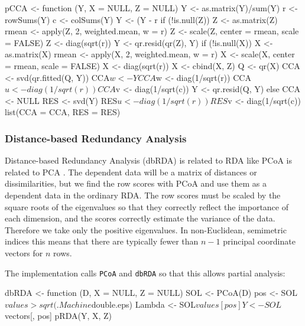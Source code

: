 \begin{Schunk}
\begin{Soutput}
pCCA <-
function (Y, X = NULL, Z = NULL) 
{
    Y <- as.matrix(Y)/sum(Y)
    r <- rowSums(Y)
    c <- colSums(Y)
    Y <- (Y - r %o% c)/sqrt(r %o% c)
    if (!is.null(Z)) {
        Z <- as.matrix(Z)
        rmean <- apply(Z, 2, weighted.mean, w = r)
        Z <- scale(Z, center = rmean, scale = FALSE)
        Z <- diag(sqrt(r)) %*% Z
        Y <- qr.resid(qr(Z), Y)
    }
    if (!is.null(X)) {
        X <- as.matrix(X)
        rmean <- apply(X, 2, weighted.mean, w = r)
        X <- scale(X, center = rmean, scale = FALSE)
        X <- diag(sqrt(r)) %*% X
        X <- cbind(X, Z)
        Q <- qr(X)
        CCA <- svd(qr.fitted(Q, Y))
        CCA$w <- Y %*% CCA$v
        CCA$w <- diag(1/sqrt(r)) %*% CCA$w %*% diag(1/CCA$d)
        CCA$u <- diag(1/sqrt(r)) %*% CCA$u
        CCA$v <- diag(1/sqrt(c)) %*% CCA$v
        Y <- qr.resid(Q, Y)
    }
    else {
        CCA <- NULL
    }
    RES <- svd(Y)
    RES$u <- diag(1/sqrt(r)) %*% RES$u
    RES$v <- diag(1/sqrt(c)) %*% RES$v
    list(CCA = CCA, RES = RES)
}
\end{Soutput}
\end{Schunk}

\subsubsection{Distance-based Redundancy Analysis}

Distance-based Redundancy Analysis (dbRDA) is related to RDA like PCoA
is related to PCA \citep{LegeAnde99}.
The dependent data will be a matrix of distances or
dissimilarities, but we find the row scores with PCoA and use them as
a dependent data in the ordinary RDA.  The row scores must be scaled
by the square roots of the eigenvalues so that they correctly reflect
the importance of each dimension, and the scores correctly estimate
the variance of the data. Therefore we take only the positive
eigenvalues. In non-Euclidean, semimetric indices this means that
there are typically fewer than $n-1$ principal coordinate vectors for
$n$ rows.

The implementation calls \texttt{PCoA} and \texttt{dbRDA} so that this
allows partial analysis:

\begin{Schunk}
\begin{Soutput}
dbRDA <-
function (D, X = NULL, Z = NULL) 
{
    SOL <- PCoA(D)
    pos <- SOL$values > sqrt(.Machine$double.eps)
    Lambda <- SOL$values[pos]
    Y <- SOL$vectors[, pos] %*% diag(sqrt(Lambda))
    pRDA(Y, X, Z)
}
\end{Soutput}
\end{Schunk}

